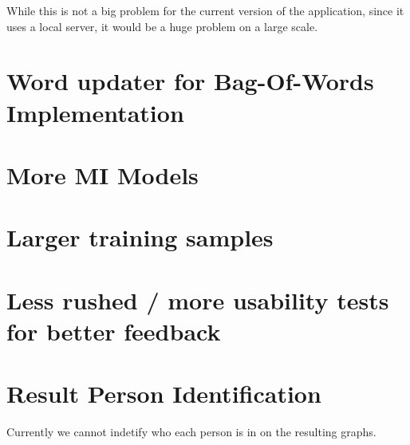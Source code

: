 While this is not a big problem for the current version of the application,
since it uses a local server, it would be a huge problem on a large scale. 

\section{Word updater for Bag-Of-Words Implementation}

\section{More MI  Models}

\section{Larger training samples}

\section{Less rushed / more usability tests for better feedback}

\section{Result Person Identification}
Currently we cannot indetify who each person is in on the resulting graphs.
